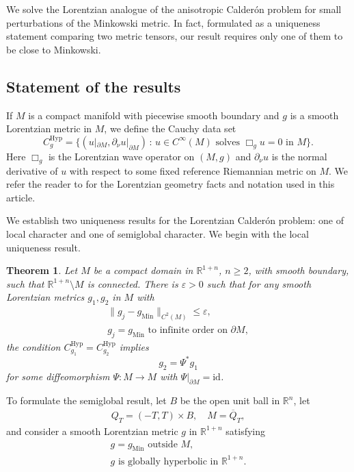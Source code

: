 \documentclass[11pt,letterpaper]{amsart}
\newtheorem{Theorem}{Theorem}[section]
\theoremstyle{definition}
\numberwithin{equation}{section}
\newcommand{\mR}{\mathbb{R}}                    %
\newcommand{\norm}[1]{\lVert #1 \rVert}         %
\newcommand{\ol}[1]{\overline{#1}}
\newcommand{\id}{\mathrm{id}}
\newcommand{\eps}{\varepsilon}
\newcommand{\p}{\partial}
\newcommand{\gm}{g_{\mathrm{Min}}}
\def\p{\partial}
\def\mid{\,:\,}
\begin{document}
We solve the Lorentzian analogue of the anisotropic Calder\'on problem for small perturbations of the Minkowski metric. In fact, formulated as a uniqueness statement comparing two metric tensors, our result requires only one of them to be close to Minkowski. 


\subsection{Statement of the results}

If $M$ is a compact manifold with piecewise smooth boundary and $g$ is a smooth Lorentzian metric in $M$, we define the Cauchy data set 
\[
C_g^{\mathrm{Hyp}} = \{ (u|_{\p M}, \p_{\nu} u|_{\p M}) \mid u \in C^{\infty}(M) \text{ solves } \Box_g u = 0 \text{ in $M$} \}.
\]
Here $\Box_g$ is the Lorentzian wave operator on $(M,g)$ and $\p_{\nu} u$ is the normal derivative of $u$ with respect to some fixed reference Riemannian metric on $M$. We refer the reader to  \cite{oksanen2024} for the Lorentzian geometry facts and notation used in this article. %

We establish two uniqueness results for the Lorentzian Calder\'on problem: one of local character and one of semiglobal character. We begin with the local uniqueness result.

\begin{Theorem} \label{thm_main1}
Let $M$ be a compact domain in $\mR^{1+n}$, $n \geq 2$, with smooth boundary, such that $\mR^{1+n} \setminus M$ is connected. There is $\eps > 0$ such that for any smooth Lorentzian metrics $g_1, g_2$ in $M$ with 
\begin{gather*}
\norm{g_j-\gm}_{C^{2}(M)} \leq \eps, \\
g_j = \gm \text{ to infinite order on $\p M$},
\end{gather*}
the condition $C_{g_1}^{\mathrm{Hyp}} = C_{g_2}^{\mathrm{Hyp}}$ implies 
\[
g_2 = \Psi^* g_1
\]
for some diffeomorphism $\Psi: M \to M$ with $\Psi|_{\p M} = \id$.
\end{Theorem}

To formulate the semiglobal result, let $B$ be the open unit ball in $\mR^n$, let 
    \begin{align*}
Q_T = (-T,T) \times B, \quad M = \ol{Q}_T,
    \end{align*}
and consider a smooth Lorentzian metric $g$ in $\mR^{1+n}$ satisfying
\begin{gather}
g = \gm \text{ outside $M$}, \label{assumption1} \\
g \text{ is globally hyperbolic in $\mR^{1+n}$.} \label{assumption2}
\end{gather}
\end{document}
